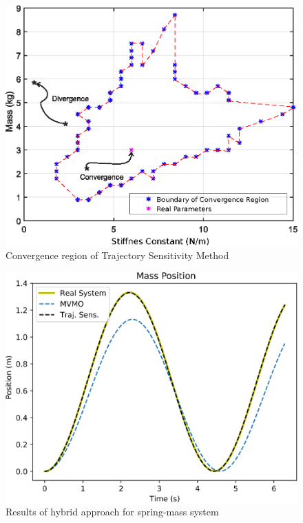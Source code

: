 \begin{figure}[h]
	\caption{Convergence region of Trajectory Sensitivity Method}
	\begin{center}
		\includegraphics[scale=0.8]{Images/Conv_reg.eps}
	\end{center}
	\label{fig: conv_reg}
\end{figure}

\begin{figure}[h]
	\caption{Results of hybrid approach for spring-mass system}
	\begin{center}
		\includegraphics[scale=0.8]{Images/SpringMass.eps}
	\end{center}
	\label{fig: spring-mass}
\end{figure}

